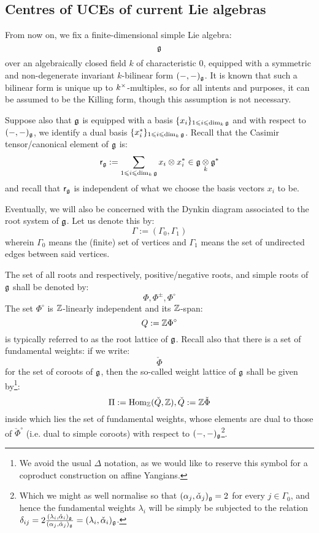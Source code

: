     \subsection{Centres of UCEs of current Lie algebras}
        \begin{convention} \label{conv: a_fixed_finite_dimensional_simple_lie_algebra}
            From now on, we fix a finite-dimensional simple Lie algebra:
                $$\mathfrak{g}$$
            over an algebraically closed field $k$ of characteristic $0$, equipped with a symmetric and non-degenerate invariant $k$-bilinear form $(-, -)_{\mathfrak{g}}$. It is known that such a bilinear form is unique up to $k^{\x}$-multiples, so for all intents and purposes, it can be assumed to be the Killing form, though this assumption is not necessary. 
    
            Suppose also that $\mathfrak{g}$ is equipped with a basis $\{x_i\}_{1 \leqslant i \leqslant \dim_k \mathfrak{g}}$ and with respect to $(-, -)_{\mathfrak{g}}$, we identify a dual basis $\{x_i^*\}_{1 \leqslant i \leqslant \dim_k \mathfrak{g}}$. Recall that the Casimir tensor/canonical element of $\mathfrak{g}$ is:
                $$\sfr_{\g} := \sum_{1 \leq i \leq \dim_k \g} x_i \tensor x_i^* \in \g \tensor_k \g^*$$
            and recall that $\mathsf{r}_{\mathfrak{g}}$ is independent of what we choose the basis vectors $x_i$ to be.
    
            Eventually, we will also be concerned with the Dynkin diagram associated to the root system of $\mathfrak{g}$. Let us denote this by:
                $$\Gamma := (\Gamma_0, \Gamma_1)$$
            wherein $\Gamma_0$ means the (finite) set of vertices and $\Gamma_1$ means the set of undirected edges between said vertices. 
    
            The set of all roots and respectively, positive/negative roots, and simple roots of $\mathfrak{g}$ shall be denoted by:
                $$\Phi, \Phi^{\pm}, \Phi^{\circ}$$
            The set $\Phi^{\circ}$ is $\mathbb{Z}$-linearly independent and its $\mathbb{Z}$-span:
                $$Q := \mathbb{Z} \Phi^{\circ}$$
            is typically referred to as the root lattice of $\mathfrak{g}$. Recall also that there is a set of fundamental weights: if we write:
                $$\check{\Phi}$$
            for the set of coroots of $\mathfrak{g}$, then the so-called weight lattice of $\mathfrak{g}$ shall be given by\footnote{We avoid the usual $\Delta$ notation, as we would like to reserve this symbol for a coproduct construction on affine Yangians.}:
                $$\Pi := \mathrm{Hom}_{\mathbb{Z}}(\check{Q}, \mathbb{Z}), \check{Q} := \mathbb{Z}\check{\Phi}$$
            inside which lies the set of fundamental weights, whose elements are dual to those of $\check{\Phi}^{\circ}$ (i.e. dual to simple coroots) with respect to $(-, -)_{\mathfrak{g}}$\footnote{Which we might as well normalise so that $(\alpha_j, \check{\alpha}_j)_{\mathfrak{g}} = 2$ for every $j \in \Gamma_0$, and hence the fundamental weights $\lambda_i$ will be simply be subjected to the relation $\delta_{ij} = 2 \frac{(\lambda_i, \check{\alpha}_i)_{\mathfrak{g}}}{(\alpha_j, \check{\alpha}_j)_{\mathfrak{g}}} = (\lambda_i, \check{\alpha}_i)_{\mathfrak{g}}$.}.
        \end{convention}

